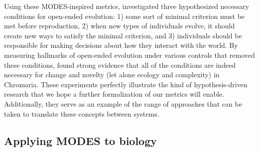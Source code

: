 \documentclass[letterpaper]{article}
\providecommand{\DIFaddtex}[1]{{\protect\color{blue}\uwave{#1}}} %
\providecommand{\DIFaddbegin}{} %
\providecommand{\DIFaddend}{} %
\providecommand{\DIFadd}[1]{\texorpdfstring{\DIFaddtex{#1}}{#1}} %
\begin{document}
Using these MODES-inspired metrics, \DIFaddbegin \DIFadd{Soros }\DIFaddend \cite{soros_necessary_2018} investigated three hypothesized necessary conditions for open-ended evolution: 1) some sort of minimal criterion \citep{soros_identifying_2014} must be met before reproduction, 2) when new types of individuals evolve, it should create new ways to satisfy the minimal criterion, and 3) individuals should be responsible for making decisions about how they interact with the world. By measuring hallmarks of open-ended evolution under various controls that removed these conditions, \DIFaddbegin \DIFadd{Soros }\DIFaddend \cite{soros_necessary_2018} found strong evidence that all of the conditions are indeed necessary for change and novelty (let alone ecology and complexity) in Chromaria. These experiments perfectly illustrate the kind of hypothesis-driven research that we hope a further formalization of our metrics will enable. Additionally, they serve as an example of the range of approaches that can be taken to translate these concepts between systems. 

\subsection{Applying MODES to biology}
\end{document}
